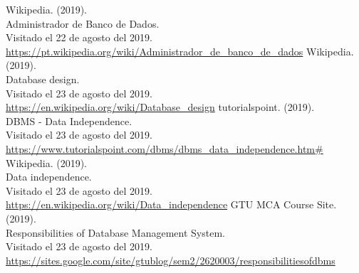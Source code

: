 \documentclass[a4paper, 12pt]{report}
\begin{document}
\begin{thebibliography}{20}
        Wikipedia. (2019).\\
        Administrador de Banco de Dados.\\
        Visitado el 22 de agosto del 2019.\\
        \url{https://pt.wikipedia.org/wiki/Administrador_de_banco_de_dados}
        Wikipedia. (2019).\\
        Database design.\\
        Visitado el 23 de agosto del 2019.\\
        \url{https://en.wikipedia.org/wiki/Database_design}
        tutorialspoint. (2019).\\
        DBMS - Data Independence.\\
        Visitado el 23 de agosto del 2019.\\
        \url{https://www.tutorialspoint.com/dbms/dbms_data_independence.htm#}
        Wikipedia. (2019).\\
        Data independence.\\
        Visitado el 23 de agosto del 2019.\\
        \url{https://en.wikipedia.org/wiki/Data_independence}
        GTU MCA Course Site. (2019).\\
        Responsibilities of Database Management System.\\
        Visitado el 23 de agosto del 2019.\\
        \url{https://sites.google.com/site/gtublog/sem2/2620003/responsibilitiesofdbms}
\end{thebibliography}
\end{document}
